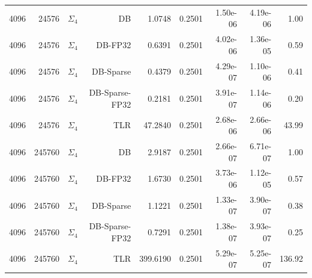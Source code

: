 \begin{tabular}{|r|r|r|r|r|r|r|r|r|}
  4096 & 24576 & $\Sigma_4$ & DB & 1.0748 & 0.2501 & 1.50e-06 & 4.19e-06 & 1.00 \\
  4096 & 24576 & $\Sigma_4$ & DB-FP32 & 0.6391 & 0.2501 & 4.02e-06 & 1.36e-05 & 0.59 \\
  4096 & 24576 & $\Sigma_4$ & DB-Sparse & 0.4379 & 0.2501 & 4.29e-07 & 1.10e-06 & 0.41 \\
  4096 & 24576 & $\Sigma_4$ & DB-Sparse-FP32 & 0.2181 & 0.2501 & 3.91e-07 & 1.14e-06 & 0.20 \\
  4096 & 24576 & $\Sigma_4$ & TLR & 47.2840 & 0.2501 & 2.68e-06 & 2.66e-06 & 43.99 \\
  4096 & 245760 & $\Sigma_4$ & DB & 2.9187 & 0.2501 & 2.66e-07 & 6.71e-07 & 1.00 \\
  4096 & 245760 & $\Sigma_4$ & DB-FP32 & 1.6730 & 0.2501 & 3.73e-06 & 1.12e-05 & 0.57 \\
  4096 & 245760 & $\Sigma_4$ & DB-Sparse & 1.1221 & 0.2501 & 1.33e-07 & 3.90e-07 & 0.38 \\
  4096 & 245760 & $\Sigma_4$ & DB-Sparse-FP32 & 0.7291 & 0.2501 & 1.38e-07 & 3.93e-07 & 0.25 \\
  4096 & 245760 & $\Sigma_4$ & TLR & 399.6190 & 0.2501 & 5.29e-07 & 5.25e-07 & 136.92 \\
  \hline
\end{tabular}
